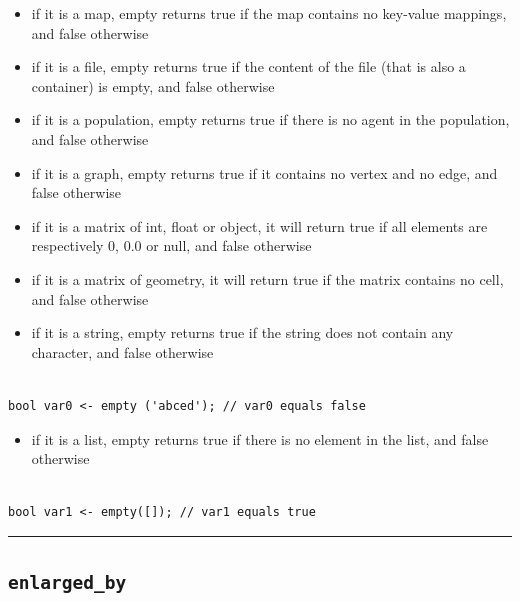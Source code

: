 \documentclass[]{book}
\providecommand{\tightlist}{%
  \setlength{\itemsep}{0pt}\setlength{\parskip}{0pt}}
\theoremstyle{definition}
\theoremstyle{definition}
\theoremstyle{definition}
\theoremstyle{remark}
\begin{document}
\begin{itemize}
\tightlist
\item
  if it is a map, empty returns true if the map contains no key-value
  mappings, and false otherwise\\
\item
  if it is a file, empty returns true if the content of the file (that
  is also a container) is empty, and false otherwise\\
\item
  if it is a population, empty returns true if there is no agent in the
  population, and false otherwise\\
\item
  if it is a graph, empty returns true if it contains no vertex and no
  edge, and false otherwise\\
\item
  if it is a matrix of int, float or object, it will return true if all
  elements are respectively 0, 0.0 or null, and false otherwise\\
\item
  if it is a matrix of geometry, it will return true if the matrix
  contains no cell, and false otherwise\\
\item
  if it is a string, empty returns true if the string does not contain
  any character, and false otherwise
\end{itemize}

\begin{verbatim}
 
bool var0 <- empty ('abced'); // var0 equals false
\end{verbatim}

\begin{itemize}
\tightlist
\item
  if it is a list, empty returns true if there is no element in the
  list, and false otherwise
\end{itemize}

\begin{verbatim}
 
bool var1 <- empty([]); // var1 equals true
\end{verbatim}

\begin{center}\rule{0.5\linewidth}{\linethickness}\end{center}

\subsection{\texorpdfstring{\texttt{enlarged\_by}}{enlarged\_by}}\label{enlarged_by}
\end{document}
